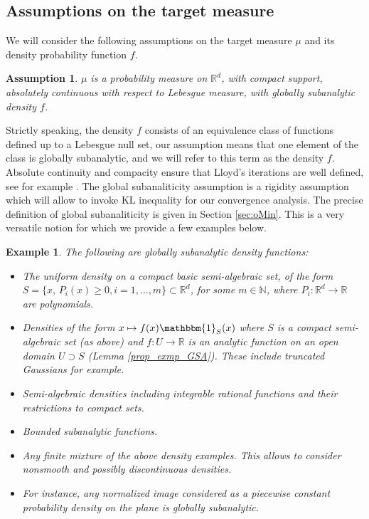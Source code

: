 \documentclass[11pt]{article}
\newcommand{\N}{\mathbb N}
\newcommand{\R}{\mathbb R}
\newcommand{\1}{\mathbbm{1}}
\newtheorem{exm}[lem]{Example}
\newtheorem{assumption}{Assumption}
\numberwithin{equation}{section}
\begin{document}
\subsection{Assumptions on the target measure}
\label{sec:pedagogyOMin}
We will consider the following assumptions on the target measure $\mu$ and its density probability function $f$.
\begin{assumption}
	\label{ass:targetMeasure} 
	$\mu$ is a probability measure on $\R^d$, with compact support, absolutely continuous with respect to Lebesgue measure, with globally subanalytic density $f$.
\end{assumption}
Strictly speaking, the density $f$ consists of an equivalence class of functions defined up to a Lebesgue null set, our assumption means that one element of the class is globally subanalytic, and we will refer to this term as the density $f$.
Absolute continuity and compacity ensure that Lloyd's iterations are well defined, see for example \cite[Assumption 3.1]{nondegeneracyLloyd}.
The global subanaliticity assumption is a rigidity assumption which will allow to invoke KL inequality for our convergence analysis. 
The precise definition of global subanaliticity is given in Section \ref{sec:oMin}. This is a very versatile notion for which we provide a few examples below.
\begin{exm}\label{exmp_GSA}
The following are globally subanalytic density functions:
\begin{itemize}
    \itemsep0em 
	\item The uniform density on a compact basic semi-algebraic set, of the form $S  = \{x,\, P_i(x) \geq 0, i =1,\ldots,m\} \subset \R^d$, for some $m \in \N$, where $P_i \colon \R^d \to \R$ are polynomials. 
	\item Densities of the form $x \mapsto f(x) \mathbbm{1}_{S}(x)$ where $S$ is a compact semi-algebraic set (as above) and $f\colon U \to \R $ is an analytic function on an open domain $U \supset S$ (Lemma \ref{prop_exmp_GSA}). These include truncated Gaussians for example. 
	\item Semi-algebraic densities including integrable rational functions and their restrictions to compact sets.
    \item Bounded subanalytic functions.
	\item Any finite mixture of the above density examples. This allows to consider nonsmooth and possibly discontinuous densities.
    \item For instance, any normalized image considered as a piecewise constant probability density on the plane is globally subanalytic.
\end{itemize}
\end{exm}
\end{document}
